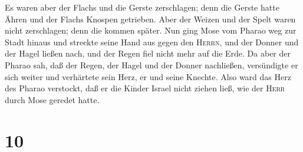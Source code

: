  Es waren aber der Flachs und die Gerste zerschlagen;
denn die Gerste hatte Ähren und der Flachs Knospen getrieben.
 Aber der Weizen und der Spelt waren nicht zerschlagen;
denn die kommen später.  Nun ging Mose vom Pharao weg zur
Stadt hinaus und streckte seine Hand aus gegen den \textsc{Herrn}, und
der Donner und der Hagel ließen nach, und der Regen fiel nicht mehr auf
die Erde.  Da aber der Pharao sah, daß der Regen, der
Hagel und der Donner nachließen, versündigte er sich weiter und
verhärtete sein Herz, er und seine Knechte.  Also ward
das Herz des Pharao verstockt, daß er die Kinder Israel nicht ziehen
ließ, wie der \textsc{Herr} durch Mose geredet hatte.

\hypertarget{section-9}{%
\section{10}\label{section-9}}

